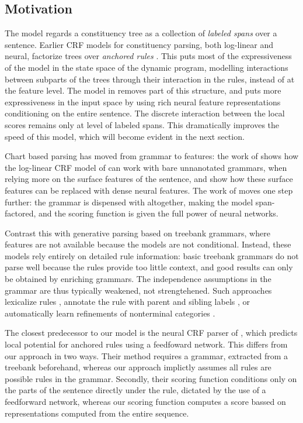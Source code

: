 \subsection{Motivation}
The model regards a constituency tree as a collection of \textit{labeled spans} over a sentence. Earlier CRF models for constituency parsing, both log-linear and neural, factorize trees over \textit{anchored rules} \citep{finkel2008crf,klein2015crf}. This puts most of the expressiveness of the model in the state space of the dynamic program, modelling interactions between subparts of the trees through their interaction in the rules, instead of at the feature level. The model in \citet{stern2017minimal} removes part of this structure, and puts more expressiveness in the input space by using rich neural feature representations conditioning on the entire sentence. The discrete interaction between the local scores remains only at level of labeled spans. This dramatically improves the speed of this model, which will become evident in the next section.

Chart based parsing has moved from grammar to features: the work of \citet{hall2014less} shows how the log-linear CRF model of \cite{finkel2008crf} can work with bare unnanotated grammars, when relying more on the surface features of the sentence, and \citet{klein2015crf} show how these surface features can be replaced with dense neural features. The work of \citep{stern2017minimal} moves one step further: the grammar is dispensed with altogether, making the model span-factored, and the scoring function is given the full power of neural networks.

Contrast this with generative parsing based on treebank grammars, where features are not available because the models are not conditional. Instead, these models rely entirely on detailed rule information: basic treebank grammars do not parse well because the rules provide too little context, and good results can only be obtained by enriching grammars. The independence assumptions in the grammar are thus typically weakened, not strengtehened. Such approaches lexicalize rules \citep{collins2003head}, annotate the rule with parent and sibling labels \citep{klein2003accurate}, or automatically learn refinements of nonterminal categories \citep{petrov2006learning}.

The closest predecessor to our model is the neural CRF parser of \citet{klein2015crf}, which predicts local potential for anchored rules using a feedfoward network. This differs from our approach in two ways. Their method requires a grammar, extracted from a treebank beforehand, whereas our approach implictly assumes all rules are possible rules in the grammar. Secondly, their scoring function conditions only on the parts of the sentence directly under the rule, dictated by the use of a feedforward network, whereas our scoring function computes a score bassed on representations computed from the entire sequence.

